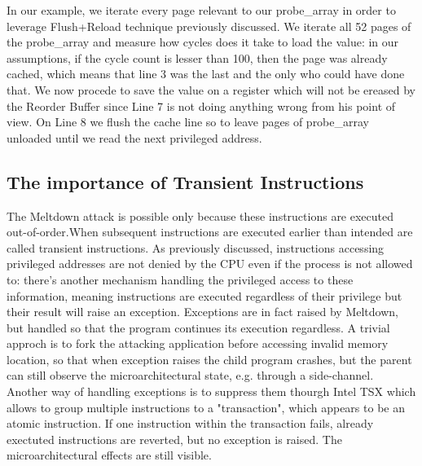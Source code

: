 In our example, we iterate every page relevant to our probe\_array in order to leverage Flush+Reload technique previously discussed.
We iterate all 52 pages of the probe\_array and measure how cycles does it take to load the value: in our assumptions, if the cycle count
is lesser than 100, then the page was already cached, which means that line 3 was the last and the only who could have done that.
We now procede to save the value on a register which will not be ereased by the Reorder Buffer since Line 7 is not doing anything wrong
from his point of view. On Line 8 we flush the cache line so to leave pages of probe\_array unloaded until we read the next privileged address.

\subsection{The importance of Transient Instructions}
The Meltdown attack is possible only because these instructions are executed out-of-order.When subsequent instructions are executed earlier than intended are called transient instructions.
As previously discussed, instructions accessing privileged addresses are not denied by the CPU even if the process is not allowed to: there's
another mechanism handling the privileged access to these information, meaning instructions are executed regardless of their privilege but their result will raise an
exception.
Exceptions are in fact raised by Meltdown, but handled so that the program continues its execution regardless.
A trivial approch is to fork the attacking application before accessing invalid memory location, so that when exception raises the child program crashes, but the parent
can still observe the microarchitectural state, e.g. through a side-channel.
Another way of handling exceptions is to suppress them thourgh Intel TSX which allows to group multiple instructions to a "transaction", which appears to be an
atomic instruction. If one instruction within the transaction fails, already exectuted instructions are reverted, but no exception is raised. The microarchitectural effects
are still visible.
